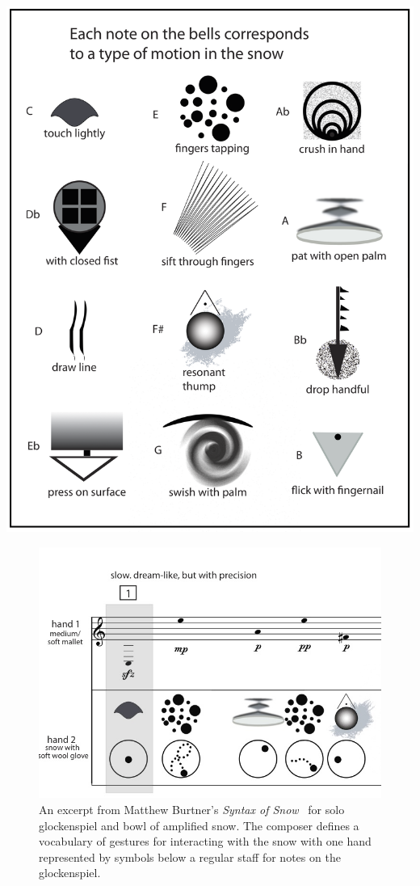 \documentclass[graybox]{svmult}
\begin{document}
\begin{table}\centering
\includegraphics[width=0.4\columnwidth]{figures/syntaxofsnow-vocabulary}
\label{tab:SyntaxOfSnowGestures}
\caption{The vocabulary of gestures to perform on the amplified snow
  in Burtner's \emph{Syntax of Snow}. Each gesture is represented by a
  symbol in the score and are played simultaneously with notes on the glockenspiel.}
\end{table}


\begin{figure}[h] \centering
\includegraphics[width=0.7\columnwidth]{figures/syntaxofsnow-excerpt.jpg}
\caption{An excerpt from Matthew Burtner's \emph{Syntax of
    Snow}~\cite{Burtner:2011fk} for solo glockenspiel and bowl of
  amplified snow. The composer defines a vocabulary of
  gestures for interacting with the snow with one hand represented by
  symbols below a regular staff for notes on the glockenspiel.}
\label{fig:SyntaxOfSnow}
\end{figure}
\end{document}
